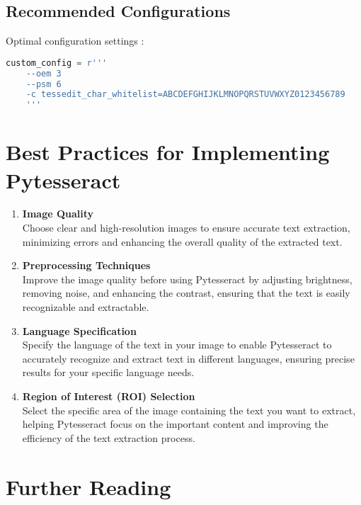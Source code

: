 \subsection{Recommended Configurations}
Optimal configuration settings :

\begin{lstlisting}[language=Python]
	custom_config = r'''
	--oem 3
	--psm 6
	-c tessedit_char_whitelist=ABCDEFGHIJKLMNOPQRSTUVWXYZ0123456789
	'''
\end{lstlisting}

\section{Best Practices for Implementing Pytesseract}
\begin{enumerate}
	\item \textbf{Image Quality}\\
	Choose clear and high-resolution images to ensure accurate text extraction, minimizing errors and enhancing the overall quality of the extracted text.
	
	\item \textbf{Preprocessing Techniques}\\
	Improve the image quality before using Pytesseract by adjusting brightness, removing noise, and enhancing the contrast, ensuring that the text is easily recognizable and extractable.
	
	\item \textbf{Language Specification}\\
	Specify the language of the text in your image to enable Pytesseract to accurately recognize and extract text in different languages, ensuring precise results for your specific language needs.
	
	\item \textbf{Region of Interest (ROI) Selection}\\
	Select the specific area of the image containing the text you want to extract, helping Pytesseract focus on the important content and improving the efficiency of the text extraction process.
\end{enumerate}


\section{Further Reading}


